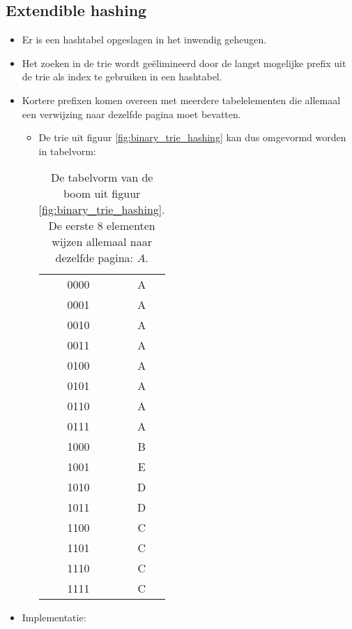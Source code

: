 \subsection{Extendible hashing}
\begin{itemize}
    \item Er is een hashtabel opgeslagen in het inwendig geheugen.
    \item Het zoeken in de trie wordt geëlimineerd door de langst mogelijke prefix uit de trie als index te gebruiken in een hashtabel.
    \item Kortere prefixen komen overeen met meerdere tabelelementen die allemaal een verwijzing naar dezelfde pagina moet bevatten.
    \begin{itemize}
        \item De trie uit figuur \ref{fig:binary_trie_hashing} kan dus omgevormd worden in tabelvorm:
        \begin{table}[h]
            \centering
            \begin{tabular}{ | c | c |}
                \hline
                0000 & A \\
                0001 & A\\
                0010 & A\\
                0011 & A\\
                0100 & A\\
                0101 & A\\
                0110 & A\\
                0111 & A\\
                1000 & B\\
                1001 & E\\
                1010 & D\\
                1011 & D\\
                1100 & C\\
                1101 & C\\
                1110 & C\\
                1111 & C\\
                \hline
            \end{tabular}
            \caption{De tabelvorm van de boom uit figuur \ref{fig:binary_trie_hashing}. De eerste 8 elementen wijzen allemaal naar dezelfde pagina: $A$.}
        \end{table}
    \end{itemize}
    \item Implementatie:
    \begin{itemize}

\end{itemize}
\end{itemize}
